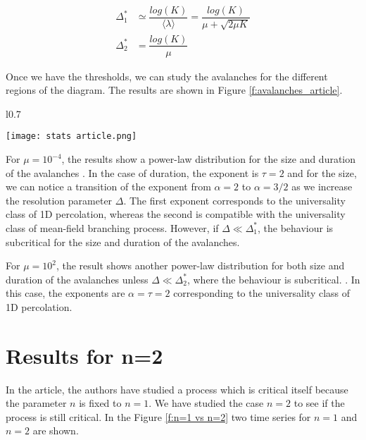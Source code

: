 \begin{align}
    \Delta_1^* &\simeq \dfrac{log(K)}{\langle \lambda \rangle}= \dfrac{log(K)}{\mu+\sqrt{2\mu K}} \label{eq:Ecuación delta1 *} \\
    \Delta_2^* &= \dfrac{log(K)}{\mu}\label{eq:Ecuación delta2 *}
\end{align}

Once we have the thresholds, we can study the avalanches for the different regions of the diagram. The results are shown in Figure \ref{f:avalanches_article}.

\begin{wrapfigure}{l}{0.7\textwidth}
    \begin{center}
      \texttt{[image: stats article.png]}
    \end{center}
    \caption{Avalanche statistics for a self-exciting Hawkes process with $n=1$ for $K=10^5$ events averaged over $R=1000$ realizations.}
    \label{f:avalanches_article}
\end{wrapfigure}

For $\mu = 10^{-4}$, the results show a power-law distribution for the size and duration of the avalanches
. In the case of duration, the exponent is $\tau=2$ and for the size, we can notice a  
transition of the exponent from $\alpha =2$ to $\alpha =3/2$ as we increase the resolution parameter $\Delta$.
The first exponent corresponds to the universality class of 1D percolation, whereas the second is compatible with the universality class of mean-field branching process.
However, if $\Delta\ll \Delta_1^*$, the behaviour is subcritical for the size and duration of the avalanches.

For $\mu = 10^2$, the result shows another power-law distribution for both size and duration of the avalanches unless $\Delta\ll \Delta_2^*$, where the behaviour is subcritical.
. In this case, the exponents are $\alpha=\tau=2$ corresponding to the universality 
class of 1D percolation.


\section{Results for n=2}

In the article, the authors have studied a process which is critical itself because the parameter $n$ is fixed to $n=1$. We have studied the case $n=2$ to see if the process is still critical. 
In the Figure \ref{f:n=1 vs n=2} two time series for $n=1$ and $n=2$ are shown. 

